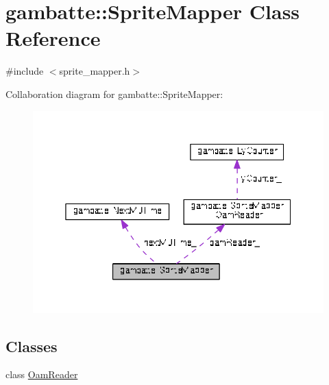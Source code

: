 \hypertarget{classgambatte_1_1SpriteMapper}{}\section{gambatte\+:\+:Sprite\+Mapper Class Reference}
\label{classgambatte_1_1SpriteMapper}


{\ttfamily \#include $<$sprite\+\_\+mapper.\+h$>$}



Collaboration diagram for gambatte\+:\+:Sprite\+Mapper\+:
\nopagebreak
\begin{figure}[H]
\begin{center}
\leavevmode
\includegraphics[width=350pt]{classgambatte_1_1SpriteMapper__coll__graph}
\end{center}
\end{figure}
\subsection*{Classes}
\begin{DoxyCompactItemize}
\item 
class \hyperlink{classgambatte_1_1SpriteMapper_1_1OamReader}{Oam\+Reader}
\end{DoxyCompactItemize}

